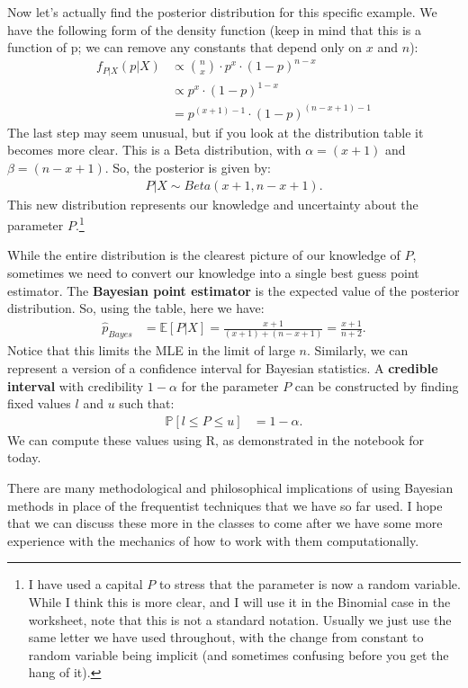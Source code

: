 \documentclass{tufte-handout}
\begin{document}
Now let's actually find the posterior distribution for this specific example.
We have the following form of the density function (keep in mind that this
is a function of p; we can remove any constants that depend only on $x$ and 
$n$):
\begin{align*}
f_{P|X}(p|X) &\propto \binom{n}{x} \cdot p^{x} \cdot (1 - p)^{n-x} \\
&\propto p^{x} \cdot (1 - p)^{1-x} \\
&=p^{(x+1) - 1} \cdot (1 - p)^{(n-x+1) - 1}
\end{align*}
The last step may seem unusual, but if you look at the distribution table 
it becomes more clear. This is a Beta distribution, with $\alpha = (x+1)$
and $\beta = (n-x+1)$. So, the posterior is given by:
\begin{align*}
P|X \sim Beta(x+1, n-x+1).
\end{align*}
This new distribution represents our knowledge and uncertainty about the
parameter $P$.\footnote{
  I have used a capital $P$ to stress that the parameter is now a
  random variable. While I think this is more clear, and I will use 
  it in the Binomial case in the worksheet, note that this is not a 
  standard notation. Usually we just use the same letter we have used
  throughout, with the change from constant to random variable being
  implicit (and sometimes confusing before you get the hang of it).
}

While the entire distribution is the clearest picture of our knowledge of
$P$, sometimes we need to convert our knowledge into a single best guess
point estimator. The \textbf{Bayesian point estimator} is the expected value
of the posterior distribution. So, using the table, here we have:
\begin{align*}
\hat{p}_{Bayes} &= \mathbb{E} [P|X] = \frac{x+1}{(x+1)+(n-x+1)} = \frac{x+1}{n + 2}.
\end{align*}
Notice that this limits the MLE in the limit of large $n$. Similarly, we
can represent a version of a confidence interval for Bayesian statistics.
A \textbf{credible interval} with credibility $1-\alpha$ for the parameter 
$P$ can be constructed by finding fixed values $l$ and $u$ such that:
\begin{align*}
\mathbb{P}[l \leq P \leq u] &= 1 - \alpha.
\end{align*}
We can compute these values using R, as demonstrated in the notebook for 
today. 

\vspace*{24pt}

\noindent
There are many methodological and philosophical implications of using
Bayesian methods in place of the frequentist techniques that we have
so far used. I hope that we can discuss these more in the classes to
come after we have some more experience with the mechanics of how to
work with them computationally.
\end{document}
